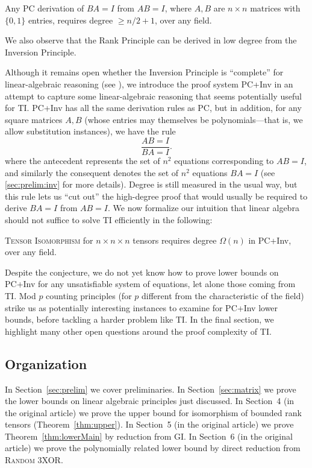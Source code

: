 \begin{theorem}
Any PC derivation of $BA = I$ from $AB=I$, where $A,B$ are $n \times n$ matrices with $\{0,1\}$ entries, requires degree $\geq n/2+1$, over any field.
\end{theorem}

We also observe that the Rank Principle can be derived in low degree from the Inversion Principle. 

Although it remains open whether the Inversion Principle is ``complete'' for linear-algebraic reasoning (see \cite{soltys, SC}), we introduce the proof system PC+Inv in an attempt to capture some linear-algebraic reasoning that seems potentially useful for \textsc{TI}. PC+Inv has all the same derivation rules as PC, but in addition, for any square matrices $A,B$ (whose entries may themselves be polynomials---that is, we allow substitution instances), we have the rule
\[
\frac{AB=I}{BA=I}.
\]
where the antecedent represents the set of $n^2$ equations corresponding to $AB=I$, and similarly the consequent denotes the set of $n^2$ equations $BA=I$ (see \ref{sec:prelim:inv} for more details). Degree is still measured in the usual way, but this rule lets us ``cut out'' the high-degree proof that would usually be required to derive $BA=I$ from $AB=I$. We now formalize our intuition that linear algebra should not suffice to solve \textsc{TI} efficiently in the following:

\begin{conjecture} \label{conj:inv}
\textsc{Tensor Isomorphism} for $n \times n \times n$ tensors requires degree $\Omega(n)$ in PC+Inv, over any field.
\end{conjecture}

Despite the conjecture, we do not yet know how to prove lower bounds on PC+Inv for any unsatisfiable system of equations, let alone those coming from \textsc{TI}. Mod $p$ counting principles (for $p$ different from the characteristic of the field) strike us as potentially interesting instances to examine for PC+Inv lower bounds, before tackling a harder problem like \textsc{TI}. In the final section, we highlight many other open questions around the proof complexity of \textsc{TI}.

\subsection{Organization}
In Section~\ref{sec:prelim} we cover preliminaries. In Section~\ref{sec:matrix} we prove the lower bounds on linear algebraic principles just discussed. In Section~4 (in the original article) we prove the upper bound for isomorphism of bounded rank tensors (Theorem~\ref{thm:upper}). In Section~5 (in the original article) we prove Theorem~\ref{thm:lowerMain} by reduction from \textsc{GI}. In Section~6 (in the original article) we prove the polynomially related lower bound by direct reduction from \textsc{Random 3XOR}.
